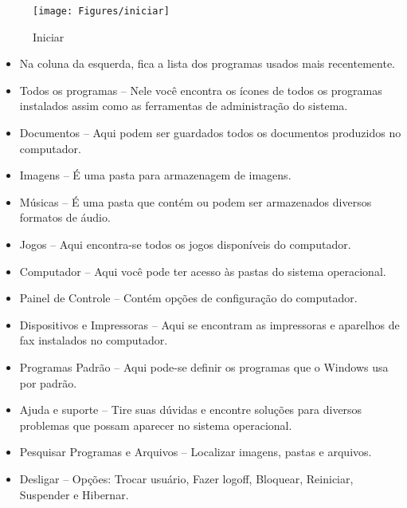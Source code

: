 \documentclass[12pt]{article}
\begin{document}
	
	\begin{figure}[!h]
		\centering
		\texttt{[image: Figures/iniciar]}
		\caption{Iniciar}
		\label{fig:iniciar}
		
	\end{figure}
	\newpage
	\begin{itemize}
	\item Na coluna da esquerda, fica a lista dos programas usados mais recentemente.

	\item Todos os programas – Nele você encontra os ícones de todos os programas instalados assim como as ferramentas de administração do sistema.
	
	\item Documentos – Aqui podem ser guardados todos os documentos produzidos no computador.
	
	\item Imagens – É uma pasta para armazenagem de imagens.
	
	\item Músicas – É uma pasta que contém ou podem ser armazenados diversos formatos de áudio.
	
	\item Jogos – Aqui encontra-se todos os jogos disponíveis do computador.
	
	\item Computador – Aqui você pode ter acesso às pastas do sistema operacional.
	
	\item Painel de Controle – Contém opções de configuração do computador.
	
	\item Dispositivos e Impressoras – Aqui se encontram as impressoras e aparelhos de fax instalados no computador.
	
	\item Programas Padrão – Aqui pode-se definir os programas que o Windows usa por padrão.
	
	\item Ajuda e suporte – Tire suas dúvidas e encontre soluções para diversos problemas que possam aparecer no sistema operacional.
	
	\item Pesquisar Programas e Arquivos – Localizar imagens, pastas e arquivos.
	
	\item Desligar – Opções: Trocar usuário, Fazer logoff, Bloquear, Reiniciar, Suspender e Hibernar.
	\end{itemize}
	
\end{document}
